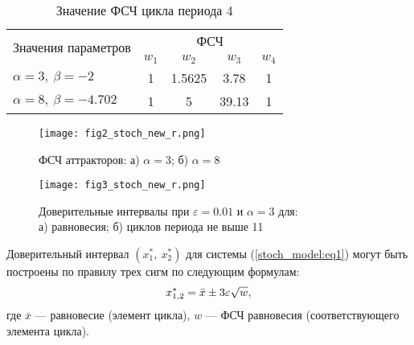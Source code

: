 \documentclass[a4paper, 14pt]{extreport}
\numberwithin{equation}{section}
\numberwithin{figure}{section}
\numberwithin{table}{section}
\begin{document}
				\begin{table}[h]
                \caption{Значение ФСЧ цикла периода 4}
				\label{tabular:w_for_4cycle}
					\begin{center}
						\begin{tabular}{| l | c | c | c | c  |}
							\hline \multirow{2}{*}{Значения параметров}
                             & \multicolumn{4}{c|}{ФСЧ} \\
                             \cline{2-5}
							 & $ w_{1} $ & $ w_{2} $ & $ w_{3} $ & $ w_{4} $ \\
							\hline
							$ \alpha = 3,~\beta = -2 $ & 1 & 1.5625 & 3.78 & 1 \\
							\hline
							$ \alpha = 8,~\beta = -4.702 $ & 1 & 5 & 39.13 & 1 \\
							\hline
						\end{tabular}
					\end{center}
				\end{table}

				\begin{figure}[h!]
					\begin{center}
						\texttt{[image: fig2\_stoch\_new\_r.png]}
					\end{center}
					\caption{ФСЧ аттракторов: а) $ \alpha = 3 $; б) $ \alpha = 8 $}
					\label{fig2_stoch}		
				\end{figure} %

				\begin{figure}[h]
					\begin{center}
						\texttt{[image: fig3\_stoch\_new\_r.png]}
					\end{center}
					\caption{Доверительные интервалы при $ \varepsilon = 0.01 $ и $ \alpha = 3 $ для: \\ а) равновесия; б) циклов периода не выше 11}
					\label{fig3_stoch}		
				\end{figure} %

				Доверительный интервал $ (x^{*}_{1},~x^{*}_{2}) $ для системы (\ref{stoch_model:eq1}) могут быть построены по правилу трех сигм по следующим формулам:
				\begin{equation}
					x^{*}_{1, 2} = \bar{x} \pm 3 \varepsilon \sqrt{w}, \\[1mm]
				\end{equation}
				где $ \bar{x} $ --- равновесие (элемент цикла), $ w $ --- ФСЧ равновесия (соответствующего элемента цикла). %
\end{document}
